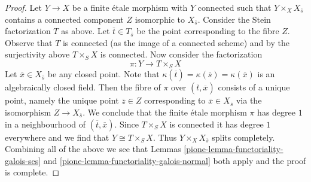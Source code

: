 \begin{proof}
\medskip\noindent
Let $Y \to X$ be a finite \'etale morphism with $Y$ connected such that
$Y \times_X X_{\overline{s}}$ contains a connected component $Z$
isomorphic to $X_{\overline{s}}$. Consider the Stein factorization $T$
as above. Let $\overline{t} \in T_{\overline{s}}$ be the point corresponding
to the fibre $Z$. Observe that $T$ is connected (as the image of a connected
scheme) and by the surjectivity above $T \times_S X$ is connected.
Now consider the factorization
$$
\pi : Y \longrightarrow T \times_S X
$$
Let $\overline{x} \in X_{\overline{s}}$ be any closed point. Note that
$\kappa(\overline{t}) = \kappa(\overline{s}) = \kappa(\overline{x})$
is an algebraically closed field.
Then the fibre of $\pi$ over $(\overline{t}, \overline{x})$ consists
of a unique point, namely the unique point $\overline{z} \in Z$
corresponding to $\overline{x} \in X_{\overline{s}}$ via the
isomorphism $Z \to X_{\overline{s}}$. We conclude that the finite
\'etale morphism $\pi$ has degree $1$ in a neighbourhood of
$(\overline{t}, \overline{x})$. Since $T \times_S X$ is connected
it has degree $1$ everywhere and we find that $Y \cong T \times_S X$.
Thus $Y \times_X X_{\overline{s}}$ splits completely.
Combining all of the above we see that
Lemmas \ref{pione-lemma-functoriality-galois-ses} and
\ref{pione-lemma-functoriality-galois-normal}
both apply and the proof is complete.
\end{proof}

